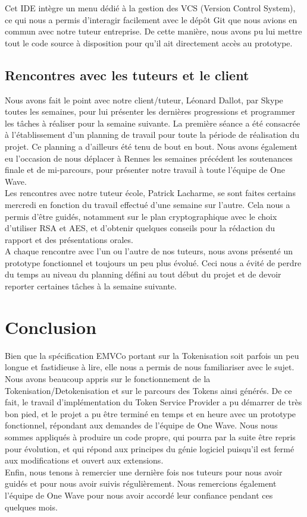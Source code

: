 \documentclass{report}
\begin{document}
\noindent
Cet IDE intègre un menu dédié à la gestion des VCS (Version Control System), ce qui nous a permis d'interagir facilement avec le dépôt Git que nous avions en commun avec notre tuteur entreprise. De cette manière, nous avons pu lui mettre tout le code source à disposition pour qu'il ait directement accès au prototype.


\section{Rencontres avec les tuteurs et le client}
Nous avons fait le point avec notre client/tuteur, Léonard Dallot, par Skype toutes les semaines, pour lui présenter les dernières progressions et programmer les tâches à réaliser pour la semaine suivante. La première séance a été consacrée à l'établissement d'un planning de travail pour toute la période de réalisation du projet. Ce planning a d'ailleurs été tenu de bout en bout. Nous avons également eu l'occasion de nous déplacer à Rennes les semaines précédent les soutenances finale et de mi-parcours, pour présenter notre travail à toute l'équipe de One Wave.\\

Les rencontres avec notre tuteur école, Patrick Lacharme, se sont faites certains mercredi en fonction du travail effectué d'une semaine sur l'autre. Cela nous a permis d'être guidés, notamment sur le plan cryptographique avec le choix d'utiliser RSA et AES, et d'obtenir quelques conseils pour la rédaction du rapport et des présentations orales.\\

A chaque rencontre avec l'un ou l'autre de nos tuteurs, nous avons présenté un prototype fonctionnel et toujours un peu plus évolué. Ceci nous a évité de perdre du temps au niveau du planning défini au tout début du projet et de devoir reporter certaines tâches à la semaine suivante.



\chapter*{Conclusion}
Bien que la spécification EMVCo portant sur la Tokenisation soit parfois un peu longue et fastidieuse à lire, elle nous a permis de nous familiariser avec le sujet. Nous avons beaucoup appris sur le fonctionnement de la Tokenisation/Detokenisation et sur le parcours des Tokens ainsi générés. De ce fait, le travail d'implémentation du Token Service Provider a pu démarrer de très bon pied, et le projet a pu être terminé en temps et en heure avec un prototype fonctionnel, répondant aux demandes de l'équipe de One Wave. Nous nous sommes appliqués à produire un code propre, qui pourra par la suite être repris pour évolution, et qui répond aux principes du génie logiciel puisqu'il est fermé aux modifications et ouvert aux extensions.\\
Enfin, nous tenons à remercier une dernière fois nos tuteurs pour nous avoir guidés et pour nous avoir suivis régulièrement. Nous remercions également l'équipe de One Wave pour nous avoir accordé leur confiance pendant ces quelques mois.
\end{document}
